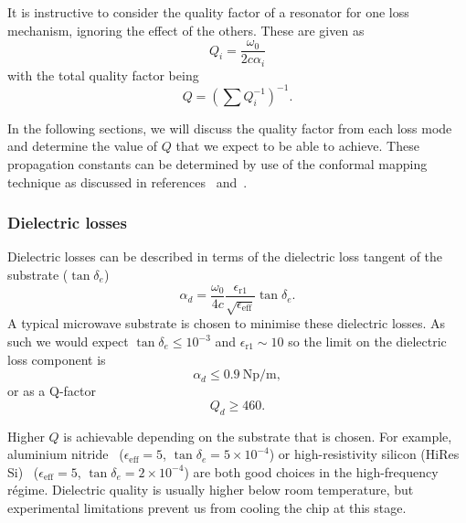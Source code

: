 It is instructive to consider the quality factor of a resonator for one loss
mechanism, ignoring the effect of the others. These are given as
\begin{equation}
  Q_i = \frac{\omega_0}{2c\alpha_i}
\end{equation}
with the total quality factor being
\begin{equation}
  Q = \left(\sum Q_i^{-1} \right)^{-1}.
\end{equation}

In the following sections, we will discuss the quality factor from
each loss mode and determine the value of $Q$ that we expect to be able to
achieve. These propagation constants can be determined by use of the conformal
mapping technique as discussed in references~\cite{1127105}
and~\cite{Collin2007}.

\subsubsection*{Dielectric losses}

Dielectric losses can be described in terms of the dielectric loss tangent of
the substrate ($\tan \delta_e$) ~\cite{Collin2007}
\begin{equation}
  \alpha_d =
  \frac{\omega_0}{4c}\frac{\epsilon_\mathrm{r1}}{\sqrt{\epsilon_\mathrm{eff}}}
  \tan \delta_e.
\end{equation}
A typical microwave substrate is chosen to minimise these dielectric losses. As
such we would expect $\tan\delta_e\leq10^{-3}$ and
$\epsilon_\mathrm{r1} \sim 10$ so the limit on the dielectric loss component is
%
%
\begin{equation}
  \alpha_d \leq \SI{0.9}{\neper\per\meter},
\end{equation}
or as a Q-factor
\begin{equation}
  Q_d \geq 460.
\end{equation}

Higher $Q$ is achievable depending on the substrate that is chosen. For example,
aluminium nitride~\cite{mw101}  ($\epsilon_\mathrm{eff}=5$, $\tan\delta_e = 5\times10^{-4}$)
or high-resistivity silicon (HiRes Si)~\cite{1717770}
($\epsilon_\mathrm{eff}=5$, $\tan\delta_e =2\times10^{-4}$) are both good
choices in the high-frequency r\'egime.  Dielectric quality is usually higher
below room temperature, but experimental limitations prevent us from cooling the
chip at this stage.

